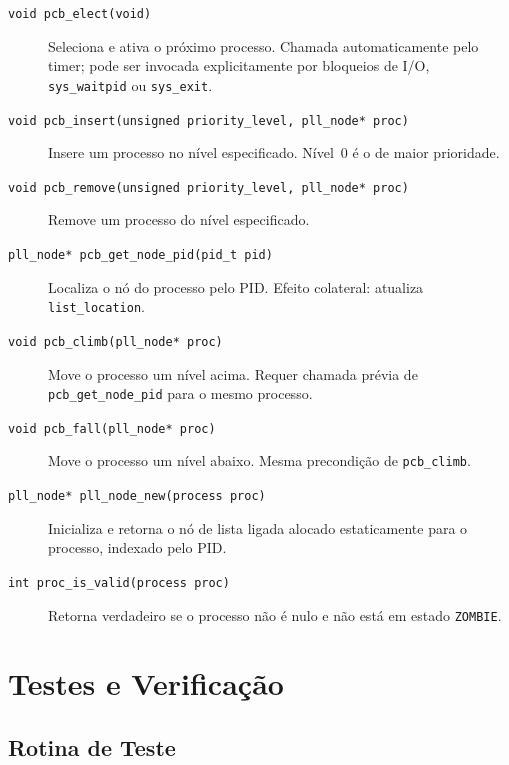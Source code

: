 \begin{description}
    \item[\texttt{void pcb\_elect(void)}] Seleciona e ativa o próximo
    processo. Chamada automaticamente pelo timer; pode ser invocada
    explicitamente por bloqueios de I/O, \texttt{sys\_waitpid} ou \texttt{sys\_exit}.

    \item[\texttt{void pcb\_insert(unsigned priority\_level, pll\_node* proc)}]
    Insere um processo no nível especificado. Nível~0 é o de maior prioridade.

    \item[\texttt{void pcb\_remove(unsigned priority\_level, pll\_node* proc)}]
    Remove um processo do nível especificado.

    \item[\texttt{pll\_node* pcb\_get\_node\_pid(pid\_t pid)}] Localiza o nó
    do processo pelo PID. Efeito colateral: atualiza \texttt{list\_location}.

    \item[\texttt{void pcb\_climb(pll\_node* proc)}] Move o processo um nível
    acima. Requer chamada prévia de \texttt{pcb\_get\_node\_pid} para o
    mesmo processo.

    \item[\texttt{void pcb\_fall(pll\_node* proc)}] Move o processo um nível
    abaixo. Mesma precondição de \texttt{pcb\_climb}.

    \item[\texttt{pll\_node* pll\_node\_new(process proc)}] Inicializa e
    retorna o nó de lista ligada alocado estaticamente para o processo,
    indexado pelo PID.

    \item[\texttt{int proc\_is\_valid(process proc)}] Retorna verdadeiro se
    o processo não é nulo e não está em estado \texttt{ZOMBIE}.
\end{description}

\section{Testes e Verificação}

\subsection{Rotina de Teste}

